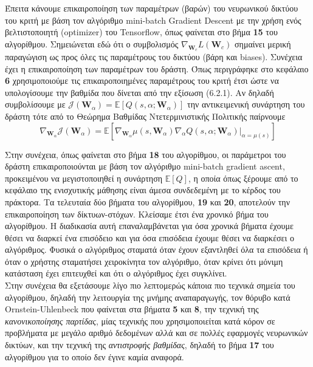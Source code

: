 \documentclass[11pt]{article} %
\numberwithin{equation}{subsection}
\begin{document}
Έπειτα κάνουμε επικαιροποίηση των παραμέτρων (βαρών) του νευρωνικού δικτύου του κριτή με βάση τον αλγόριθμο mini-batch Gradient Descent με την χρήση ενός βελτιστοποιητή (optimizer) του Tensorflow, όπως φαίνεται στο βήμα \textbf{15} του αλγορίθμου. Σημειώνεται εδώ ότι ο συμβολισμός $\nabla_{\textbf{W}_c} L(\textbf{W}_{c})$ σημαίνει μερική παραγώγιση ως προς όλες τις παραμέτρους του δικτύου (βάρη και biases). Συνέχεια έχει η επικαιροποίηση των παραμέτρων του δράστη. Όπως περιγράφηκε στο κεφάλαιο \textbf{6} χρησιμοποιούμε τις επικαιροποιημένες παραμέτρους του κριτή έτσι ώστε να υπολογίσουμε την βαθμίδα που δίνεται από την εξίσωση (6.2.1). Αν δηλαδή συμβολίσουμε με $\mathcal{J}(\textbf{W}_α) = \mathbb{E}\left[Q(s,\alpha; \textbf{W}_α) \right]$ την αντικειμενική συνάρτηση του δράστη τότε από το Θεώρημα Βαθμίδας Ντετερμινιστικής Πολιτικής \cite{dpga} παίρνουμε
\begin{equation}
\nabla_{\textbf{W}_α} \mathcal{J}(\textbf{W}_α) = \mathbb{E} \left[ \nabla_{\textbf{W}_α} \mu(s, \textbf{W}_α) \nabla_{α} Q(s,\alpha; \textbf{W}_α) |_{α = \mu(s)} \right]
\end{equation}

Στην συνέχεια, όπως φαίνεται στο βήμα \textbf{18} του αλγορίθμου, οι παράμετροι του δράστη επικαιροποιούνται με βάση τον αλγόριθμο mini-batch gradient ascent, προκειμένου να μεγιστοποιηθεί η συνάρτηση $\mathbb{E}[Q]$, η οποία όπως ξέρουμε από το κεφάλαιο της ενισχυτικής μάθησης είναι άμεσα συνδεδεμένη με το κέρδος του πράκτορα. Τα τελευταία δύο βήματα του αλγορίθμου, \textbf{19} και \textbf{20}, αποτελούν την επικαιροποίηση των δίκτυων-στόχων. Κλείσαμε έτσι ένα χρονικό βήμα του αλγορίθμου. Η διαδικασία αυτή επαναλαμβάνεται για όσα χρονικά βήματα έχουμε θέσει να διαρκεί ένα επισόδειο και για όσα επισόδεια έχουμε θέσει να διαρκέσει ο αλγόριθμος. Φυσικά ο αλγόριθμος σταματά όταν έχουν εξαντληθεί όλα τα επισόδεια ή όταν ο χρήστης σταματήσει χειροκίνητα τον αλγόριθμο, όταν κρίνει ότι μόνιμη κατάσταση έχει επιτευχθεί και ότι ο αλγόριθμος έχει συγκλίνει.\\

Στην συνέχεια θα εξετάσουμε λίγο πιο λεπτομερώς κάποια πιο τεχνικά σημεία του αλγορίθμου, δηλαδή την λειτουργία της μνήμης αναπαραγωγής, τον θόρυβο κατά Ornstein-Uhlenbeck που φαίνεται στα βήματα \textbf{5} και \textbf{8}, την τεχνική της \textit{κανονικοποίησης παρτίδας}, μίας τεχνικής που χρησιμοποιείται κατά κόρον σε προβλήματα με μεγάλο αριθμό δεδομένων αλλά και σε πολλές εφαρμογές νευρωνικών δικτύων, και την τεχνική της \textit{αντιστροφής βαθμίδας}, δηλαδή το βήμα \textbf{17} του αλγορίθμου για το οποίο δεν έγινε καμία αναφορά.\\
\end{document}
